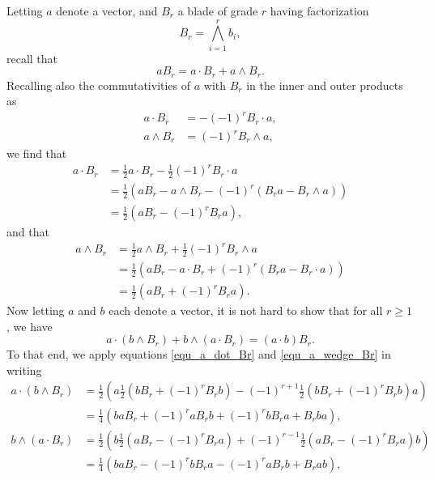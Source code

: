 \documentclass{birkjour}
\theoremstyle{definition}
\theoremstyle{remark}
\numberwithin{equation}{section}
\begin{document}
Letting $a$ denote a vector, and $B_r$ a blade of grade $r$ having factorization
\begin{equation}\label{equ_B_r}
B_r = \bigwedge_{i=1}^r b_i,
\end{equation}
recall that
\begin{equation}
aB_r = a\cdot B_r + a\wedge B_r.
\end{equation}
Recalling also the commutativities of $a$ with $B_r$ in the inner and outer products as
\begin{align}
a\cdot B_r &= -(-1)^r B_r\cdot a,\label{equ_a_dot_Br_commutativity} \\
a\wedge B_r &= (-1)^r B_r\wedge a,\label{equ_a_wedge_Br_commutativity}
\end{align}
we find that
\begin{align}
a\cdot B_r &= \frac{1}{2}a\cdot B_r - \frac{1}{2}(-1)^r B_r\cdot a\nonumber \\
 &= \frac{1}{2}(aB_r - a\wedge B_r - (-1)^r(B_ra - B_r\wedge a))\nonumber \\
 &= \frac{1}{2}(aB_r-(-1)^rB_ra),\label{equ_a_dot_Br}
\end{align}
and that
\begin{align}
a\wedge B_r &= \frac{1}{2}a\wedge B_r + \frac{1}{2}(-1)^r B_r\wedge a\nonumber \\
 &= \frac{1}{2}(aB_r - a\cdot B_r + (-1)^r(B_ra - B_r\cdot a))\nonumber \\
 &= \frac{1}{2}(aB_r+(-1)^rB_ra).\label{equ_a_wedge_Br}
\end{align}
Now letting $a$ and $b$ each denote a vector, it is not hard to show that for all $r\geq 1$, we have
\begin{equation}\label{equ_a_dot_b_wedge_Br_identity}
a\cdot(b\wedge B_r) + b\wedge(a\cdot B_r) = (a\cdot b)B_r.
\end{equation}
To that end, we apply equations \eqref{equ_a_dot_Br} and \eqref{equ_a_wedge_Br} in writing
\begin{align*}
a\cdot(b\wedge B_r)
 &= \frac{1}{2}\left(a\frac{1}{2}\left(bB_r + (-1)^rB_rb\right)-(-1)^{r+1}\frac{1}{2}\left(bB_r+(-1)^rB_rb\right)a\right) \\
 &= \frac{1}{4}\left(baB_r + (-1)^raB_rb + (-1)^rbB_ra + B_rba\right), \\
b\wedge(a\cdot B_r)
 &= \frac{1}{2}\left(b\frac{1}{2}\left(aB_r-(-1)^rB_ra\right)+(-1)^{r-1}\frac{1}{2}\left(aB_r-(-1)^rB_ra\right)b\right) \\
 &= \frac{1}{4}\left(baB_r - (-1)^rbB_ra - (-1)^raB_rb + B_rab\right),
\end{align*}
\end{document}
